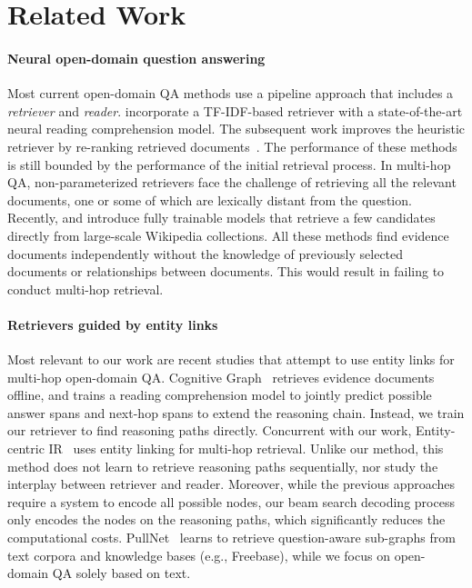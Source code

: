 \vspace{-3.5mm}
\section{Related Work} \vspace{-2mm}
\paragraph{Neural open-domain question answering}
Most current open-domain QA methods use a pipeline approach that includes a {\it retriever} and {\it reader}. 
\cite{chen2017reading} incorporate a TF-IDF-based retriever with a state-of-the-art neural reading comprehension model.
The subsequent work improves the heuristic retriever by re-ranking retrieved documents~\citep{wang2018r,wang2018evidence,lee2018ranking,lin2018denoising}.
The performance of these methods is still bounded by the performance of the initial retrieval process. 
In multi-hop QA, non-parameterized retrievers face the challenge of retrieving all the relevant documents, one or some of which are lexically distant from the question.
Recently, \cite{lee-chang-toutanova:2019:ACL2019} and \cite{denspi} introduce fully trainable models that retrieve a few candidates directly from large-scale Wikipedia collections.
All these methods find evidence documents independently without the knowledge of previously selected documents or relationships between documents.
This would result in failing to conduct multi-hop retrieval.

\vspace{-2mm}
\paragraph{Retrievers guided by entity links}
Most relevant to our work are recent studies that attempt to use entity links for multi-hop open-domain QA. 
Cognitive Graph~\citep{cognitive_graph_2019} retrieves evidence documents offline, and trains a reading comprehension model to jointly predict possible answer spans and next-hop spans to extend the reasoning chain. Instead, we train our retriever to find reasoning paths directly.
Concurrent with our work, Entity-centric IR~\citep{godbole2019entity_links} uses entity linking for multi-hop retrieval.
Unlike our method, this method does not learn to retrieve reasoning paths sequentially, nor study the interplay between retriever and reader.
Moreover, while the previous approaches require a system to encode all possible nodes, our beam search decoding process only encodes the nodes on the reasoning paths, which significantly reduces the computational costs.
PullNet~\citep{sun-etal-2019-pullnet} learns to retrieve question-aware sub-graphs from text corpora and knowledge bases (e.g., Freebase), while we focus on open-domain QA solely based on text.

